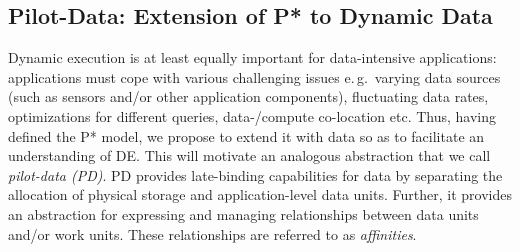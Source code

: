 \documentclass[conference,final]{IEEEtran}
\newcommand{\jhanote}[1]{ {\textcolor{red} { ***shantenu: #1 }}}
\newcommand{\alnote}[1]{ {\textcolor{blue} { ***andre: #1 }}}
\newcommand{\alnote}[1]{}
\newcommand{\jhanote}[1]{}
\newcommand{\upp}{\vspace*{-0.5em}}
\begin{document}
\subsection{Pilot-Data: Extension of P* to Dynamic Data\upp\upp}
\label{sec:pilot-data}








Dynamic execution is at least equally important for data-intensive
applications: applications must cope with various challenging issues
e.\,g.\ varying data sources (such as sensors and/or other application
components), fluctuating data rates, optimizations for different
queries, data-/compute co-location etc. Thus, having defined the P*
model, we propose to extend it with data so as to facilitate an
understanding of DE. This will motivate an analogous abstraction that
we call \emph{pilot-data (PD)}. PD provides late-binding
capabilities for data by separating the allocation of
physical storage and application-level data units. Further, it
provides an abstraction for expressing and managing relationships
between data units and/or work units. These relationships are
referred to as \emph{affinities}.  %
\end{document}
